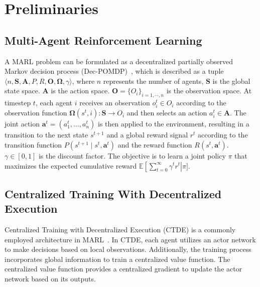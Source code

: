 \section{Preliminaries}
\label{Preliminaries}
\subsection{Multi-Agent Reinforcement Learning}
A MARL problem can be formulated as a decentralized partially observed Markov decision process (Dec-POMDP)~\cite{oliehoek2016concise}, which is described as a tuple $\langle n,\boldsymbol{S},\boldsymbol{A},P,R,\boldsymbol{O},\boldsymbol{\Omega},\gamma\rangle $, where $n$ represents the number of agents, $\boldsymbol{S}$ is the global state space. $\boldsymbol{A}$ is the action space. $\boldsymbol{O}=\{O_{i}\}_{i=1,\cdots,n}$ is the observation space. At timestep $t$, each agent $i$ receives an observation $o_{i}^t\in O_{i}$ according to the observation function $\boldsymbol{\Omega}(s^t,i):\boldsymbol{S}\to O_i$ and then selects an action $a_i^t\in\boldsymbol{A}$. The joint action $\boldsymbol{a}^t=(a_1^t,\ldots,a_n^t)$ is then applied to the environment, resulting in a transition to the next state $s^{t+1}$ and a global reward signal $r^{t}$ according to the transition function $P(s^{t+1}\mid s^{t},\boldsymbol{a}^t)$ and the reward function $R(s^t,\boldsymbol{a}^t)$. $\gamma\in[0,1]$ is the discount factor. The objective is to learn a joint policy $\pi$ that maximizes the expected cumulative reward $\mathbb{E}\left[\sum_{t=0}^{\infty}\gamma^{t}r^{t}\right|\pi]$.

\subsection{Centralized Training With Decentralized Execution}
Centralized Training with Decentralized Execution (CTDE) is a commonly employed architecture in MARL~\cite{lowe2017multi,rashid2020monotonic}. In CTDE, each agent utilizes an actor network to make decisions based on local observations. Additionally, the training process incorporates global information to train a centralized value function. The centralized value function provides a centralized gradient to update the actor network based on its outputs.

